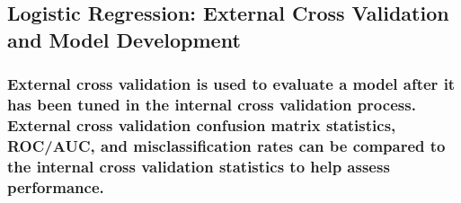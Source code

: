 \documentclass[american,]{article}
\begin{document}
\hypertarget{logistic-regression-external-cross-validation-and-model-development}{%
\subsection{\texorpdfstring{\textbf{Logistic Regression: External Cross Validation and Model Development}}{Logistic Regression: External Cross Validation and Model Development}}\label{logistic-regression-external-cross-validation-and-model-development}}

\hypertarget{external-cross-validation-is-used-to-evaluate-a-model-after-it-has-been-tuned-in-the-internal-cross-validation-process.-external-cross-validation-confusion-matrix-statistics-rocauc-and-misclassification-rates-can-be-compared-to-the-internal-cross-validation-statistics-to-help-assess-performance.}{%
\subsubsection{External cross validation is used to evaluate a model after it has been tuned in the internal cross validation process. External cross validation confusion matrix statistics, ROC/AUC, and misclassification rates can be compared to the internal cross validation statistics to help assess performance.}\label{external-cross-validation-is-used-to-evaluate-a-model-after-it-has-been-tuned-in-the-internal-cross-validation-process.-external-cross-validation-confusion-matrix-statistics-rocauc-and-misclassification-rates-can-be-compared-to-the-internal-cross-validation-statistics-to-help-assess-performance.}}
\end{document}

